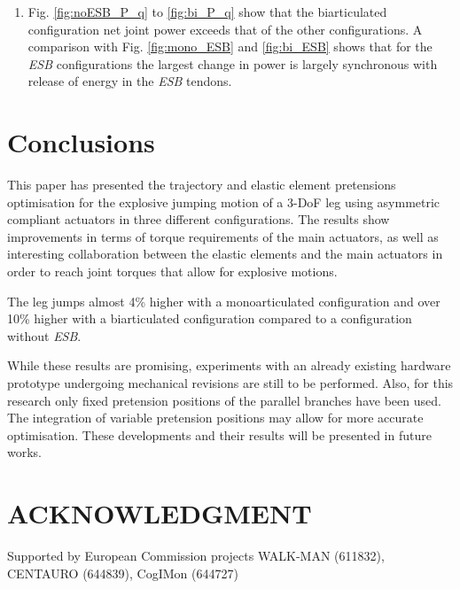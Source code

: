 \documentclass[letterpaper, 10 pt, conference]{ieeeconf}  %
\begin{document}
\begin{enumerate}
	\item Fig. \ref{fig:noESB_P_q} to \ref{fig:bi_P_q} show that the biarticulated configuration net joint power exceeds that of the other configurations. A comparison with Fig. \ref{fig:mono_ESB} and \ref{fig:bi_ESB} shows that for the \textit{ESB} configurations the largest change in power is largely synchronous with release of energy in the \textit{ESB} tendons.
	
\end{enumerate}


\section{Conclusions} \label{sec:conclusions} 
This paper has presented the trajectory and elastic element pretensions optimisation for the explosive jumping motion of a 3-DoF leg using asymmetric compliant actuators in three different configurations. The results show improvements in terms of torque requirements of the main actuators, as well as interesting collaboration between the elastic elements and the main actuators in order to reach joint torques that allow for explosive motions.

The leg jumps almost 4\% higher with a monoarticulated configuration and over 10\% higher with a biarticulated configuration compared to a configuration without \textit{ESB}.

While these results are promising, experiments with an already existing hardware prototype undergoing mechanical revisions are still to be performed. Also, for this research only fixed pretension positions of the parallel branches have been used. The integration of variable pretension positions may allow for more accurate optimisation. These developments and their results will be presented in future works.


\addtolength{\textheight}{-0cm}   %


\section{ACKNOWLEDGMENT}
Supported by European Commission projects WALK-MAN (611832), CENTAURO (644839), CogIMon (644727)



\end{document}

